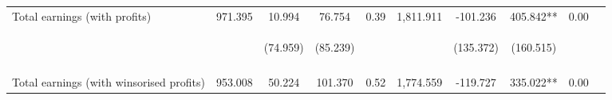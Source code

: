 \begin{tabular}{lccccccccc}
\noalign{\smallskip}Total earnings (with profits) & 971.395 & 10.994 & 76.754 & 0.39 & 1,811.911 & -101.236 & 405.842** & 0.00 & \\
 & \begin{footnotesize}\end{footnotesize} & \begin{footnotesize}(74.959)\end{footnotesize} & \begin{footnotesize}(85.239)\end{footnotesize} & \begin{footnotesize}\end{footnotesize} & \begin{footnotesize}\end{footnotesize} & \begin{footnotesize}(135.372)\end{footnotesize} & \begin{footnotesize}(160.515)\end{footnotesize} & \begin{footnotesize}\end{footnotesize} & \begin{footnotesize}\end{footnotesize}\\
 & \begin{footnotesize}\end{footnotesize} & \begin{footnotesize}[1.000]\end{footnotesize} & \begin{footnotesize}[1.000]\end{footnotesize} & \begin{footnotesize}\end{footnotesize} & \begin{footnotesize}\end{footnotesize} & \begin{footnotesize}[1.000]\end{footnotesize} & \begin{footnotesize}[0.023]\end{footnotesize} & \begin{footnotesize}\end{footnotesize} & \begin{footnotesize}\end{footnotesize}\\
\noalign{\smallskip}Total earnings (with winsorised profits) & 953.008 & 50.224 & 101.370 & 0.52 & 1,774.559 & -119.727 & 335.022** & 0.00 & \\

\end{tabular}

